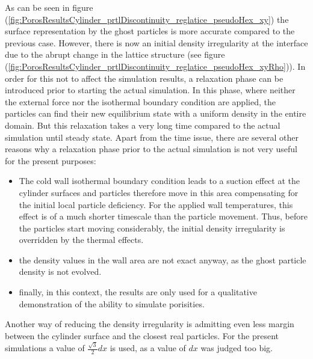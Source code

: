 \documentclass{report}
\begin{document}
As can be seen in figure (\ref{fig:PorosResultsCylinder_prtlDiscontinuity_reglatice_pseudoHex_xy}) the surface representation by the ghost particles is more accurate compared to the previous case. However, there is now an initial density irregularity at the interface due to the abrupt change in the lattice structure (see figure (\ref{fig:PorosResultsCylinder_prtlDiscontinuity_reglatice_pseudoHex_xyRho})). 
In order for this not to affect the simulation results, a relaxation phase can be introduced prior to starting the actual simulation. In this phase, where neither the external force nor the isothermal boundary condition are applied, the particles can find their new equilibrium state with a uniform density in the entire domain. But this relaxation takes a very long time compared to the actual simulation until steady state.
Apart from the time issue, there are several other reasons why a relaxation phase prior to the actual simulation is not very useful for the present purposes: 
\begin{itemize}
 \item 	The cold wall isothermal boundary condition leads to a suction effect at the cylinder surfaces and particles therefore move in this area compensating for the initial local particle deficiency. For the applied wall temperatures, this effect is of a much shorter timescale than the particle movement. Thus, before the particles start moving considerably, the initial density irregularity is overridden by the thermal effects.
\item the density values in the wall area are not exact anyway, as the ghost particle density is not evolved.
\item finally, in this context, the results are only used for a qualitative demonstration of the ability to simulate porisities.
\end{itemize}


Another way of reducing the density irregularity is admitting even less margin between the cylinder surface and the closest real particles. For the present simulations a value of $\frac{\sqrt{3}}{2}dx$ is used, as a value of $dx$ was judged too big.
\end{document}
